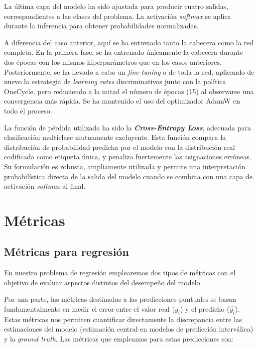 La última capa del modelo ha sido ajustada para producir cuatro salidas, correspondientes a las clases del 
problema. 
La activación \textit{softmax} se aplica durante la inferencia para obtener probabilidades normalizadas.

A diferencia del caso anterior, aquí se ha entrenado tanto la cabecera como la red completa. En la primera 
fase, se ha entrenado únicamente la cabecera durante dos épocas con los mismos hiperparámetros que en los 
casos anteriores. Posteriormente, se ha llevado a cabo un \textit{fine-tuning } o de toda la red, aplicando 
de nuevo la estrategia de \textit{learning rates} discriminativos junto con la política OneCycle, pero 
reduciendo a la mitad el número de épocas (15) al observarse una convergencia más rápida.
Se ha mantenido el uso del optimizador AdamW en todo el proceso.

La función de pérdida utilizada ha sido la \textbf{\textit{Cross-Entropy Loss}}, adecuada para clasificación 
multiclase mutuamente excluyente. Esta función compara la distribución de probabilidad predicha por el modelo 
con la distribución real codificada como etiqueta única, y penaliza fuertemente las asignaciones erróneas. 
Su formulación es robusta, ampliamente utilizada y permite una interpretación probabilística directa de la 
salida del modelo cuando se combina con una capa de activación \textit{softmax} al final.


\section{Métricas}


\subsection{Métricas para regresión}

En nuestro problema de regresión emplearemos dos tipos de métricas con el objetivo de evaluar aspectos 
distintos del desempeño del modelo.

Por una parte, las métricas destinadas a las predicciones puntuales se basan fundamentalmente en medir el 
error entre el valor real ($y_i$) y el predicho ($\hat{y_i}$). Estas métricas nos permiten cuantificar 
directamente la discrepancia entre las estimaciones del modelo (estimación central en modelos de predicción
interválica) y la \textit{ground truth}. Las métricas que empleamos para estas predicciones son:

